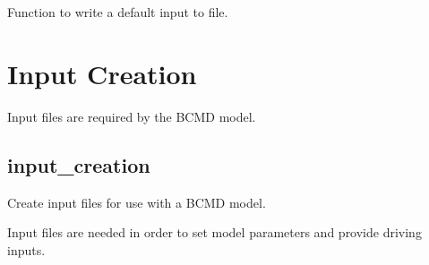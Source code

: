 \documentclass[letterpaper,10pt,english]{sphinxmanual}
\begin{document}
\begin{fulllineitems}
\begin{fulllineitems}
\end{fulllineitems}


\begin{fulllineitems}
\label{\detokenize{bcmdModel:bayescmd.bcmdModel.ModelBCMD.write_initialised_input}}
Function to write a default input to file.

\end{fulllineitems}


\end{fulllineitems}



\section{Input Creation}
\label{\detokenize{bcmdModel:input-creation}}
Input files are required by the BCMD model.


\subsection{input\_creation}
\label{\detokenize{bcmdModel:id1}}\label{\detokenize{bcmdModel:module-bayescmd.bcmdModel.input_creation}}
Create input files for use with a BCMD model.

Input files are needed in order to set model parameters and provide driving
inputs.
\end{document}
